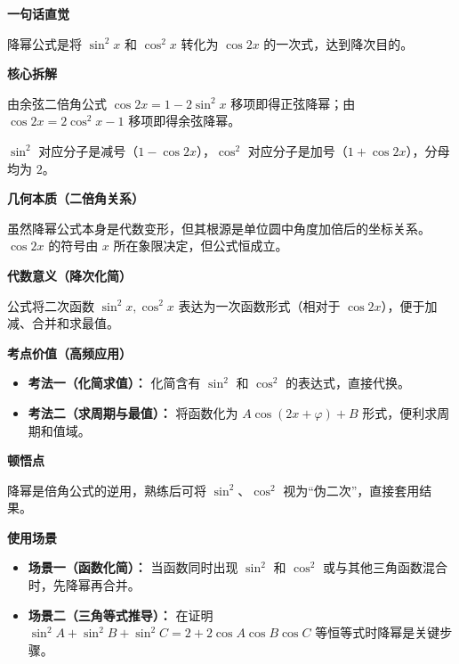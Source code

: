 \begin{explanationbox}

	\textbf{\textcolor{CExplanation}{一句话直觉}}

	降幂公式是将 $\sin^2 x$ 和 $\cos^2 x$ 转化为 $\cos 2x$ 的一次式，达到降次目的。

	\medskip
	\textbf{\textcolor{CExplanation}{核心拆解}}
	\begin{description}[style=nextline, leftmargin=2.8em, labelsep=0.5em, itemsep=0.45em]
		\item[\textbf{要点一（公式推导来源）：}] 由余弦二倍角公式 $\cos 2x = 1-2\sin^2 x$ 移项即得正弦降幂；由 $\cos 2x = 2\cos^2 x-1$ 移项即得余弦降幂。
		\item[\textbf{要点二（符号记忆口诀）：}] $\sin^2$ 对应分子是减号（$1-\cos 2x$），$\cos^2$ 对应分子是加号（$1+\cos 2x$），分母均为 $2$。
	\end{description}

	\medskip
	\textbf{\textcolor{CExplanation}{几何本质（二倍角关系）}}

	虽然降幂公式本身是代数变形，但其根源是单位圆中角度加倍后的坐标关系。$\cos 2x$ 的符号由 $x$ 所在象限决定，但公式恒成立。

	\medskip
	\textbf{\textcolor{CExplanation}{代数意义（降次化简）}}

	公式将二次函数 $\sin^2 x,\cos^2 x$ 表达为一次函数形式（相对于 $\cos 2x$），便于加减、合并和求最值。

	\medskip
	\textbf{\textcolor{CExplanation}{考点价值（高频应用）}}
	\begin{itemize}[leftmargin=*, itemsep=0.5em, topsep=0.4em]
		\item \textbf{考法一（化简求值）：} 化简含有 $\sin^2$ 和 $\cos^2$ 的表达式，直接代换。
		\item \textbf{考法二（求周期与最值）：} 将函数化为 $A\cos(2x+\varphi)+B$ 形式，便利求周期和值域。
	\end{itemize}

	\medskip
	\textbf{\textcolor{CExplanation}{顿悟点}}

	降幂是倍角公式的逆用，熟练后可将 $\sin^2$、$\cos^2$ 视为“伪二次”，直接套用结果。

	\medskip
	\textbf{\textcolor{CExplanation}{使用场景}}
	\begin{itemize}[leftmargin=*, itemsep=0.5em, topsep=0.4em]
		\item \textbf{场景一（函数化简）：} 当函数同时出现 $\sin^2$ 和 $\cos^2$ 或与其他三角函数混合时，先降幂再合并。
		\item \textbf{场景二（三角等式推导）：} 在证明 $\sin^2 A+\sin^2 B+\sin^2 C=2+2\cos A\cos B\cos C$ 等恒等式时降幂是关键步骤。
	\end{itemize}
\end{explanationbox}
